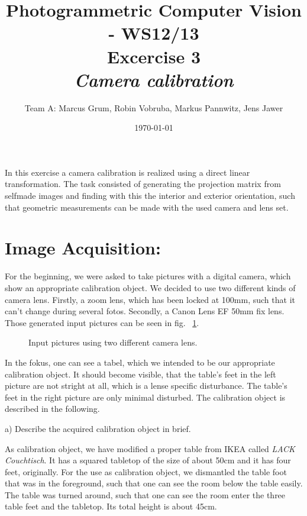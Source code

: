 \documentclass[a4paper,headings=small]{scrartcl}
\title{Photogrammetric Computer Vision - WS12/13 \\ Excercise 3 \\ \emph{Camera calibration}}
\author{Team A: Marcus Grum, Robin Vobruba, Markus Pannwitz, Jens Jawer}
\date{\today}
\numberwithin{equation}{section} %
\numberwithin{figure}{section}   %
\newcommand{\generatedImgRootImg}{../resources/img}
\begin{document}
\maketitle

In this exercise a camera calibration is realized using a direct linear transformation. 
The task consisted of generating the projection matrix from selfmade images 
and finding with this the interior and exterior orientation, 
such that geometric measurements can be made with the used camera and lens set.

\section{Image Acquisition:}

For the beginning, we were asked to take pictures with a digital camera,
which show an appropriate calibration object. 
We decided to use two different kinds of camera lens.
Firstly, a zoom lens, which has been locked at 100mm, such that it can't change
during several fotos.
Secondly, a Canon Lens EF 50mm fix lens.
Those generated input pictures can be seen in fig. ~\ref{fig:Input pictures}.

\begin{figure}
   \hfill
  \caption{Input pictures using two different camera lens.}
  \label{fig:Input pictures}
\end{figure}

In the fokus, one can see a tabel, which we intended to be our 
appropriate calibration object. It should become visible, 
that the table's feet in the left picture are not stright at all,
which is a lense specific disturbance.
The table's feet in the right picture are only minimal disturbed.
The calibration object is described in the following.

a) Describe the acquired calibration object in brief.

As calibration object, we have modified a proper table from IKEA called \emph{LACK Couchtisch}.
It has a squared tabletop of the size of about 50cm and it has four feet, originally.
For the use as calibration object, we dismantled the table foot
that was in the foreground, such that one can see the room below the table easily.
The table was turned around, such that one can see the room enter the three table feet 
and the tabletop. Its total height is about 45cm.
\end{document}
